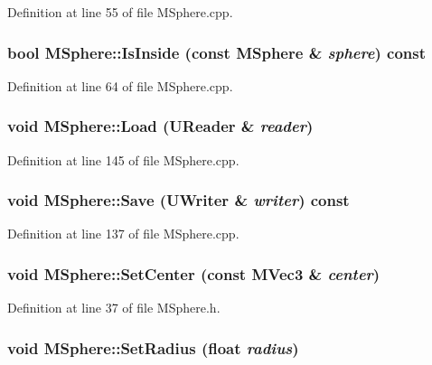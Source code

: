 Definition at line 55 of file MSphere.cpp.\hypertarget{class_m_sphere_8fffb948b9e22055e9bf8ddd267c9715}{
\subsubsection[{IsInside}]{\setlength{\rightskip}{0pt plus 5cm}bool MSphere::IsInside (const {\bf MSphere} \& {\em sphere}) const}}
\label{class_m_sphere_8fffb948b9e22055e9bf8ddd267c9715}




Definition at line 64 of file MSphere.cpp.\hypertarget{class_m_sphere_5b22737c077b40775756e2845859c925}{
\subsubsection[{Load}]{\setlength{\rightskip}{0pt plus 5cm}void MSphere::Load ({\bf UReader} \& {\em reader})}}
\label{class_m_sphere_5b22737c077b40775756e2845859c925}




Definition at line 145 of file MSphere.cpp.\hypertarget{class_m_sphere_7481f688cff487b8d49d597d73263db8}{
\subsubsection[{Save}]{\setlength{\rightskip}{0pt plus 5cm}void MSphere::Save ({\bf UWriter} \& {\em writer}) const}}
\label{class_m_sphere_7481f688cff487b8d49d597d73263db8}




Definition at line 137 of file MSphere.cpp.\hypertarget{class_m_sphere_b511291f81201151624da739876a1284}{
\subsubsection[{SetCenter}]{\setlength{\rightskip}{0pt plus 5cm}void MSphere::SetCenter (const {\bf MVec3} \& {\em center})}}
\label{class_m_sphere_b511291f81201151624da739876a1284}




Definition at line 37 of file MSphere.h.\hypertarget{class_m_sphere_94cc442a90bbb4f5d4f3e8e9036cef71}{
\subsubsection[{SetRadius}]{\setlength{\rightskip}{0pt plus 5cm}void MSphere::SetRadius (float {\em radius})}}
\label{class_m_sphere_94cc442a90bbb4f5d4f3e8e9036cef71}




